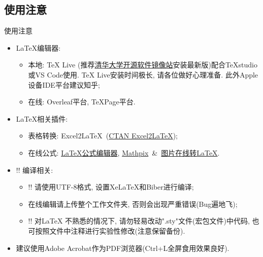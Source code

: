 \documentclass[hyperref, UTF8, CJK, aspectratio=169]{beamer}
\begin{document}
\subsection{使用注意}
\begin{frame}{使用注意}
	\begin{itemize}
		\item<1-> \LaTeX 编辑器:
		\begin{itemize}
			\item<1-> 本地: TeX Live (推荐\href{https://mirrors.tuna.tsinghua.edu.cn/CTAN/systems/texlive/Images/}{\color{univblue}清华大学开源软件镜像站}安装最新版)配合TeXstudio或VS Code使用. TeX Live安装时间极长, 请各位做好心理准备. 此外Apple设备IDE平台建议知乎;
			\item<1-> 在线: Overleaf平台, TeXPage平台.
		\end{itemize}
		\item<2-> \LaTeX 相关插件:
		\begin{itemize}
			\item<2-> 表格转换: Excel2\LaTeX~(\href{https://www.ctan.org/tex-archive/support/excel2latex/}{\color{univblue}CTAN Excel2\LaTeX});
			\item<2-> 在线公式: \href{https://www.latexlive.com/}{\color{univblue}LaTeX公式编辑器}, \href{https://mathpix.com/}{\color{univblue}
				Mathpix}~\&~\href{https://mathf.itewqq.cn/}{\color{univblue}图片在线转LaTeX}.
		\end{itemize}
		\item<3-> \color{univred}!! 编译相关:
		\begin{itemize}
			\item<3-> \color{univred}!! 请使用UTF-8格式, 设置XeLaTeX和Biber进行编译;
			\item<3-> 在线编辑请上传整个工作文件夹, 否则会出现严重错误(Bug遍地飞);
			\item<3-> \color{univred}!! 对\LaTeX{} 不熟悉的情况下, 请勿轻易改动".sty"文件(宏包文件)中代码, 也可按照文件中注释进行实验性修改(注意保留备份).
		\end{itemize}
		\item<4-> \color{univred} 建议使用Adobe Acrobat作为PDF浏览器(Ctrl+L全屏食用效果良好).
	\end{itemize}
\end{frame}
\end{document}

